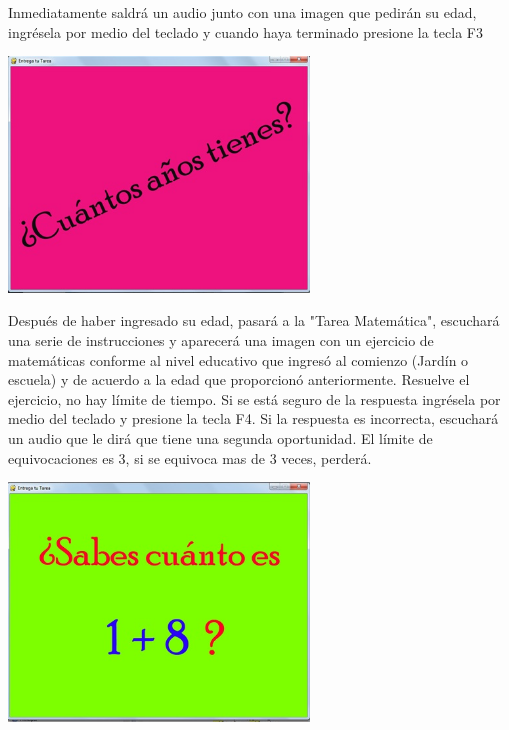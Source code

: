 \documentclass[12pt]{report}
\begin{document}

Inmediatamente saldrá un audio junto con una imagen que pedirán su edad, ingrésela por medio del teclado y cuando haya terminado presione la tecla F3

	\begin{center}
		\begingroup
			\includegraphics[width=0.6\textwidth]{imagenes_usuario/anios.jpg}
		\endgroup
	\end{center}



Después de haber ingresado su edad, pasará a la "Tarea Matemática", escuchará una serie de instrucciones y aparecerá una imagen con un ejercicio de matemáticas conforme al nivel educativo que ingresó al comienzo (Jardín o escuela) y de acuerdo a la edad que proporcionó anteriormente.
Resuelve el ejercicio, no hay límite de tiempo. Si se está seguro de la respuesta ingrésela por medio del teclado y presione la tecla F4.
Si la respuesta es incorrecta, escuchará un audio que le dirá que tiene una segunda oportunidad. El límite de equivocaciones es 3, si se equivoca mas de 3 veces, perderá.

	\begin{center}
		\begingroup
			\includegraphics[width=0.6\textwidth]{imagenes_usuario/ejercicio.jpg}
		\endgroup
	\end{center}
\end{document}
